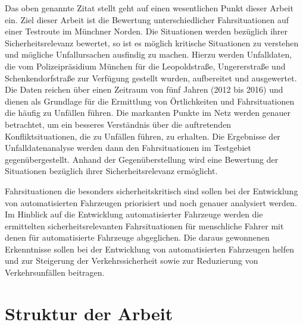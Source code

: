 Das oben genannte Zitat stellt geht auf einen wesentlichen Punkt dieser Arbeit ein. Ziel dieser Arbeit ist die Bewertung unterschiedlicher Fahrsituationen auf einer Testroute im Münchner Norden. Die Situationen werden bezüglich ihrer Sicherheitsrelevanz bewertet, so ist es möglich kritische Situationen zu verstehen und mögliche Unfallursachen ausfindig zu machen. Hierzu werden Unfalldaten, die vom Polizeipräsidium München für die Leopoldstraße, Ungererstraße und Schenkendorfstraße zur Verfügung gestellt wurden, aufbereitet und ausgewertet. Die Daten reichen über einen Zeitraum von fünf Jahren (2012 bis 2016) und dienen als Grundlage für die Ermittlung von Örtlichkeiten und Fahrsituationen die häufig zu Unfällen führen. Die markanten Punkte im Netz werden genauer betrachtet, um ein besseres Verständnis über die auftretenden Konfliktsituationen, die zu Unfällen führen, zu erhalten. Die Ergebnisse der Unfalldatenanalyse werden dann den Fahrsituationen im Testgebiet gegenübergestellt. Anhand der Gegenüberstellung wird eine Bewertung der Situationen bezüglich ihrer Sicherheitsrelevanz ermöglicht.

Fahrsituationen die besonders sicherheitskritisch sind sollen bei der Entwicklung von automatisierten Fahrzeugen priorisiert und noch genauer analysiert werden. Im Hinblick auf die Entwicklung automatisierter Fahrzeuge werden die ermittelten sicherheitsrelevanten Fahrsituationen für menschliche Fahrer mit denen für automatisierte Fahrzeuge abgeglichen. Die daraus gewonnenen Erkenntnisse sollen bei der Entwicklung von automatisierten Fahrzeugen helfen und zur Steigerung der Verkehrssicherheit sowie zur Reduzierung von Verkehrsunfällen beitragen. 

\section{Struktur der Arbeit}

